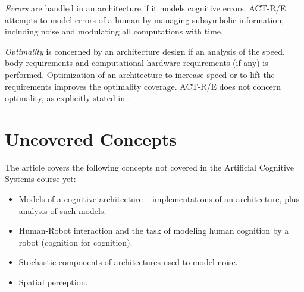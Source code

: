 \documentclass[10pt]{article}
\begin{document}
\emph{Errors} are handled in an architecture if it models cognitive errors. ACT-R/E attempts to model errors of a human by managing subsymbolic information, including noise and modulating all computations with time.

\emph{Optimality} is concerned by an architecture design if an analysis of the speed, body requirements and computational hardware requirements (if any) is performed. Optimization of an architecture to increase speed or to lift the requirements improves the optimality coverage. ACT-R/E does not concern optimality, as explicitly stated in \cite{actre}. 

\section{Uncovered Concepts}

The article \cite{actre} covers the following concepts not covered in the Artificial Cognitive Systems course yet:

\begin{itemize}
	\item Models of a cognitive architecture -- implementations of an architecture, plus analysis of such models.
	\item Human-Robot interaction and the task of modeling human cognition by a robot (cognition for cognition).
	\item Stochastic components of architectures used to model noise.
	\item Spatial perception.
\end{itemize}

\begin{thebibliography}{2}
\end{thebibliography}
\end{document}
